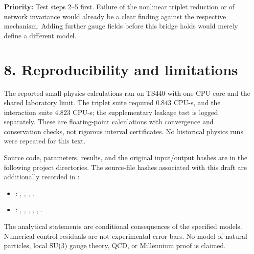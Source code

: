\documentclass[a4paper,11pt]{article}
\begin{document}
\textbf{Priority:} Test steps 2--5 first. Failure of the nonlinear triplet reduction or of network invariance would already be a clear finding against the respective mechanism. Adding further gauge fields before this bridge holds would merely define a different model.

\section*{8. Reproducibility and limitations}
The reported small physics calculations ran on TS440 with one CPU core and the shared laboratory limit. The triplet suite required $0.843$ CPU-s, and the interaction suite $4.823$ CPU-s; the supplementary leakage test is logged separately. These are floating-point calculations with convergence and conservation checks, not rigorous interval certificates. No historical physics runs were repeated for this text.

Source code, parameters, results, and the original input/output hashes are in the following project directories. The source-file hashes associated with this draft are additionally recorded in :
\begin{itemize}
\item {}: , , , .
\item {}: , , , , , .
\end{itemize}
The analytical statements are conditional consequences of the specified models. Numerical control residuals are not experimental error bars. No model of natural particles, local SU(3) gauge theory, QCD, or Millennium proof is claimed.
\end{document}
